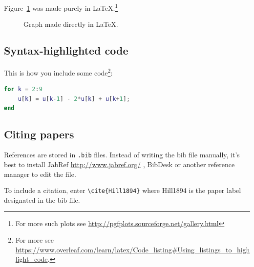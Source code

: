 \documentclass{amsart}
\begin{document}
 Figure~\ref{fig:csvfig} was made purely in \LaTeX.\footnote{For more such plots see \url{http://pgfplots.sourceforge.net/gallery.html}}

\begin{figure}[htb]
  \centering
\caption{Graph made directly in LaTeX.}\label{fig:csvfig}
\end{figure}

 \subsection{Syntax-highlighted code}
 This is how you include some code\footnote{For more see \url{https://www.overleaf.com/learn/latex/Code_listing\#Using_listings_to_highlight_code}.}:
\begin{lstlisting}[language=Matlab]
for k = 2:9
    u[k] = u[k-1] - 2*u[k] + u[k+1];
end
\end{lstlisting}

\subsection{Citing papers}

References are stored in \texttt{.bib} files. Instead of writing the bib file manually, it's best to install JabRef \url{http://www.jabref.org/} , BibDesk or another reference manager to edit the file.

To include a citation, enter \verb|\cite{Hill1894}| where Hill1894 is the paper label designated in the bib file.
\end{document}
